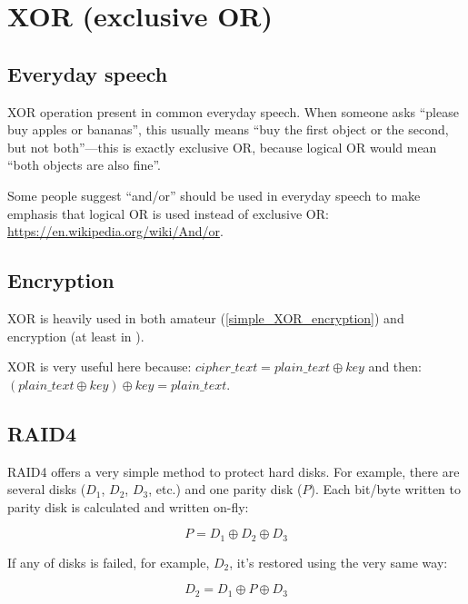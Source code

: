 ﻿\section{XOR (exclusive OR)}
\label{XOR_property}



\subsection{Everyday speech}

XOR operation present in common everyday speech.
When someone asks ``please buy apples or bananas'',
this usually means ``buy the first object or the second, but not both''---this is exactly exclusive OR,
because logical OR would mean ``both objects are also fine''.

Some people suggest ``and/or'' should be used in everyday speech to make emphasis that logical OR is used instead of
exclusive OR: \url{https://en.wikipedia.org/wiki/And/or}.

\subsection{Encryption}

XOR is heavily used in both amateur (\ref{simple_XOR_encryption}) and  encryption (at least in ).

XOR is very useful here because:
$cipher\_text = plain\_text \oplus key$ and then:
$(plain\_text \oplus key) \oplus key = plain\_text$.

\subsection{\ac{RAID}4}

\ac{RAID}4 offers a very simple method to protect hard disks.
For example, there are several disks ($D_1$, $D_2$, $D_3$, etc.) and one parity disk ($P$).
Each bit/byte written to parity disk is calculated and written on-fly:

\begin{equation} \label{eq:RAID4}
P = D_1 \oplus D_2 \oplus D_3
\end{equation}

If any of disks is failed, for example, $D_2$, it's restored using the very same way:

\begin{equation}
D_2 = D_1 \oplus P \oplus D_3
\end{equation}

